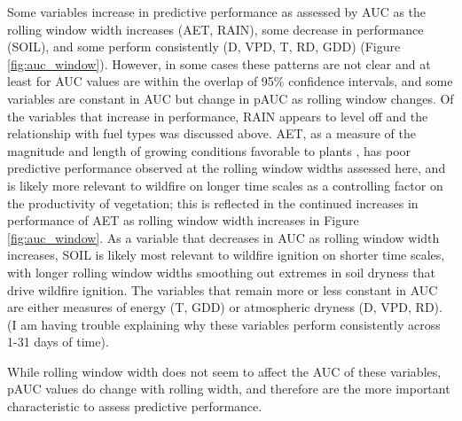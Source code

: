 \documentclass[11p]{article}
\begin{document}
Some variables increase in predictive performance as assessed by AUC as the rolling window width increases (AET, RAIN), some decrease in performance (SOIL), and some perform consistently (D, VPD, T, RD, GDD) (Figure \ref{fig:auc_window}). However, in some cases these patterns are not clear and at least for AUC values are within the overlap of 95\% confidence intervals, and some variables are constant in AUC but change in pAUC as rolling window changes. Of the variables that increase in performance, RAIN appears to level off and the relationship with fuel types was discussed above. AET, as a measure of the magnitude and length of growing conditions favorable to plants \citep{stephensonActualEvapotranspirationDeficit1998}, has poor predictive performance observed at the rolling window widths assessed here, and is likely more relevant to wildfire on longer time scales as a controlling factor on the productivity of vegetation; this is reflected in the continued increases in performance of AET as rolling window width increases in Figure \ref{fig:auc_window}. As a variable that decreases in AUC as rolling window width increases, SOIL is likely most relevant to wildfire ignition on shorter time scales, with longer rolling window widths smoothing out extremes in soil dryness that drive wildfire ignition. The variables that remain more or less constant in AUC are either measures of energy (T, GDD) or atmospheric dryness (D, VPD, RD). (I am having trouble explaining why these variables perform consistently across 1-31 days of time).

While rolling window width does not seem to affect the AUC of these variables, pAUC values do change with rolling width, and therefore are the more important characteristic to assess predictive performance.

\end{document}
